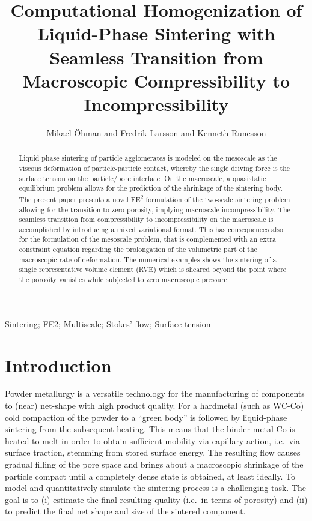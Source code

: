 \documentclass[12pt,review]{elsarticle}
\title{Computational Homogenization of Liquid-Phase Sintering with Seamless Transition from Macroscopic Compressibility to Incompressibility}
\author{Mikael \"Ohman and Fredrik Larsson and Kenneth Runesson}
\begin{document}
\begin{frontmatter}
\begin{abstract}
\noindent
Liquid phase sintering of particle agglomerates is modeled on the mesoscale as the viscous deformation of particle-particle contact, whereby the single driving force is the surface tension on the particle/pore interface.
On the macroscale, a quasistatic equilibrium problem allows for the prediction of the shrinkage of the sintering body.
The present paper presents a novel FE\textsuperscript{2} formulation of the two-scale sintering problem allowing for the transition to zero porosity, implying macroscale incompressibility.
The seamless transition from compressibility to incompressibility on the macroscale is accomplished by introducing a mixed variational format.
This has consequences also for the formulation of the mesoscale problem, that is complemented with an extra constraint equation regarding the prolongation of the volumetric part of the macroscopic rate-of-deformation.
The numerical examples shows the sintering of a single representative volume element (RVE) which is sheared beyond the point where the porosity vanishes while subjected to zero macroscopic pressure.
\end{abstract}
\begin{keyword}
Sintering; FE2; Multiscale; Stokes' flow; Surface tension
\end{keyword}
\end{frontmatter}


\section{Introduction}
Powder metallurgy is a versatile technology for the manufacturing of components to (near) net-shape with high product quality.
For a hardmetal (such as WC-Co) cold compaction of the powder to a ``green body'' is followed by liquid-phase sintering from the subsequent heating.
This means that the binder metal Co is heated to melt in order to obtain sufficient mobility via capillary action, i.e.\ via surface traction, stemming from stored surface energy.
The resulting flow causes gradual filling of the pore space and brings about a macroscopic shrinkage of the particle compact until a completely dense state is obtained, at least ideally.
To model and quantitatively simulate the sintering process is a challenging task.
The goal is to (i) estimate the final resulting quality (i.e.\ in terms of porosity) and (ii) to predict the final net shape and size of the sintered component.
\end{document}
